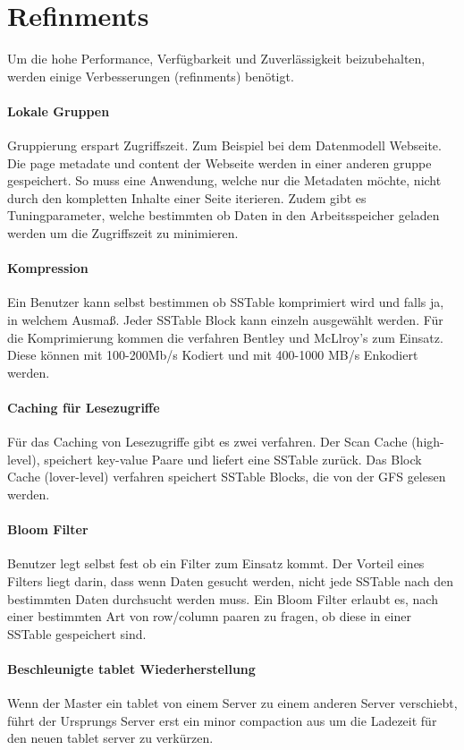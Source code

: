 \section{Refinments}
Um die hohe Performance, Verfügbarkeit und Zuverlässigkeit beizubehalten, werden einige Verbesserungen (refinments) benötigt.

\paragraph{Lokale Gruppen}
Gruppierung erspart Zugriffszeit. Zum Beispiel bei dem Datenmodell Webseite. Die \glqq page metadate \grqq und \glqq content \grqq der Webseite werden in einer anderen gruppe gespeichert. So muss eine Anwendung, welche nur die Metadaten möchte, nicht durch den kompletten Inhalte einer Seite iterieren.
Zudem gibt es Tuningparameter, welche bestimmten ob Daten in den Arbeitsspeicher geladen werden um die Zugriffszeit zu minimieren.

\paragraph{Kompression}
Ein Benutzer kann selbst bestimmen ob SSTable komprimiert wird und falls ja, in welchem Ausmaß. Jeder SSTable Block kann einzeln ausgewählt werden. Für die Komprimierung kommen die  verfahren Bentley und McLlroy’s zum Einsatz. Diese können mit 100-200Mb/s Kodiert und mit 400-1000 MB/s Enkodiert werden.

\paragraph{Caching für Lesezugriffe}
Für das Caching von Lesezugriffe gibt es zwei verfahren. Der Scan Cache (high-level), speichert key-value Paare und liefert eine SSTable zurück. Das Block Cache (lover-level) verfahren speichert SSTable Blocks, die von der GFS gelesen werden.

\paragraph{Bloom Filter}
Benutzer legt selbst fest ob ein Filter zum Einsatz kommt. Der Vorteil eines Filters liegt darin, dass wenn Daten gesucht werden, nicht jede SSTable nach den bestimmten Daten durchsucht werden muss. Ein Bloom Filter erlaubt es, nach einer bestimmten Art von row/column paaren zu fragen, ob diese in einer SSTable gespeichert sind.

\paragraph{Beschleunigte tablet Wiederherstellung}
Wenn der Master ein tablet von einem Server zu einem anderen Server verschiebt, führt der Ursprungs Server erst ein \glqq minor compaction \grqq aus um die Ladezeit für den neuen tablet server zu verkürzen.

